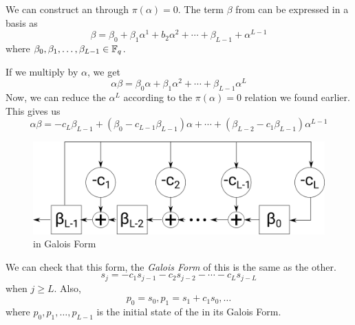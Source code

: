 We can construct an   through $\pi(\alpha) = 0$.
The term $\beta$ from  can be expressed in a  basis as
\begin{equation}\label{eq:Extension_Field-Beta}
  \beta = \beta_{0} + \beta_{1}\alpha^{1} + b_{2}\alpha^{2} + \cdots + \beta_{L-1} + \alpha^{L-1}
\end{equation}
where $\beta_{0}, \beta_{1}, \ldots, \beta_{L-1} \in \mathbb{F}_{q^{}}$.

If we multiply  by $\alpha$, we get
\begin{equation*}
  \alpha\beta = \beta_{0}\alpha + \beta_{1}\alpha^{2} + \cdots + \beta_{L-1}\alpha^{L}
\end{equation*}
Now, we can reduce the $\alpha^{L}$ according to the $\pi(\alpha)=0$ relation we found earlier.
This gives us
\begin{equation}\label{eq:LFSR_Galois_Equation}
  \alpha\beta = -c_{L}\beta_{L-1} + \left( \beta_{0} - c_{L-1}\beta_{L-1} \right) \alpha + \cdots + \left( \beta_{L-2} - c_{1}\beta_{L-1} \right) \alpha^{L-1}
\end{equation}

\begin{figure}[h!]
  \centering
  \includegraphics[scale=0.5]{./Drawings/EDIN01-Cryptography/Linear_Feedback_Shift_Register-Galois.png}
  \caption{ in Galois Form}
  \label{fig:LFSR_Galois}
\end{figure}

We can check that this form, the \emph{Galois Form} of this  is the same as the other.
\begin{equation*}
  s_{j} = -c_{1}s_{j-1} - c_{2}s_{j-2} - \cdots - c_{L}s_{j-L}
\end{equation*}
when $j \geq L$.
Also,
\begin{equation*}
  p_{0} = s_{0}, p_{1} = s_{1} + c_{1}s_{0}, \ldots
\end{equation*}
where $p_{0}, p_{1}, \ldots, p_{L-1}$ is the initial state of the  in its Galois Form.

